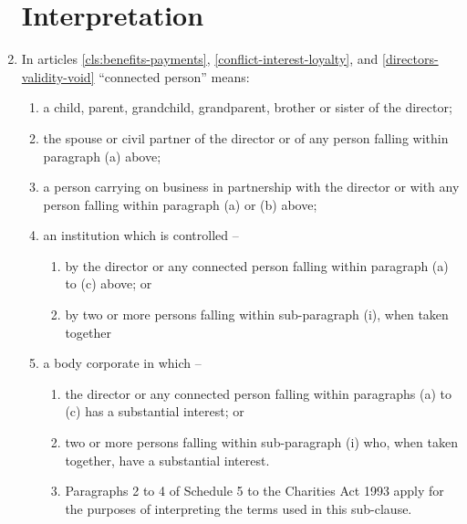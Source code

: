 \begin{enumerate}
\section{Interpretation}

\item \label{def-connected}
    In articles \ref{cls:benefits-payments}, \ref{conflict-interest-loyalty},
    and \ref{directors-validity-void} ``connected person'' means:
    \begin{enumerate}
    \item
      \label{art:connected-child} a child, parent, grandchild,
      grandparent, brother or sister of the director;
    \item
      \label{art:connected-spouse} the spouse or civil partner of the
      director or of any person falling within paragraph (a) above;
    \item
      \label{art:connected-business} a person carrying on business in
      partnership with the director or with any person falling within
      paragraph (a) or (b) above;
    \item
      an institution which is controlled –
      \begin{enumerate}
      \item
        by the director or any connected person falling within paragraph (a) to (c) above; or
      \item
        by two or more persons falling within sub-paragraph (i), when taken
        together
      \end{enumerate}
    \item
      a body corporate in which –
      \begin{enumerate}
        \item
            the director or any connected person falling within paragraphs (a) to (c) has a substantial interest; or
        \item
            two or more persons falling within sub-paragraph (i) who, when
            taken together, have a substantial interest.
        \item
            Paragraphs 2 to 4 of Schedule 5 to the Charities Act 1993 apply for the
            purposes of interpreting the terms used in this sub-clause.
        \end{enumerate}
    \end{enumerate}
\end{enumerate}
